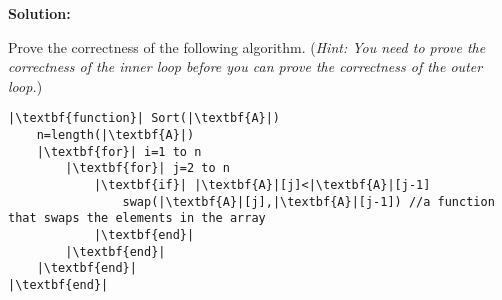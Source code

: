 \documentclass[9pt]{article}
\begin{document}
\textbf{Solution:} \\
        
        \fi
        \newpage
        
        
        
        \vspace{5mm}
        
        \item 
        Prove the correctness of the following algorithm. (\textit{Hint: You need to prove the correctness of the inner loop before you can prove the correctness of the outer loop.})
        
\begin{small}
\begin{lstlisting}
|\textbf{function}| Sort(|\textbf{A}|)
    n=length(|\textbf{A}|) 
    |\textbf{for}| i=1 to n
        |\textbf{for}| j=2 to n
            |\textbf{if}| |\textbf{A}|[j]<|\textbf{A}|[j-1]
                swap(|\textbf{A}|[j],|\textbf{A}|[j-1]) //a function that swaps the elements in the array
            |\textbf{end}|
        |\textbf{end}|
    |\textbf{end}|
|\textbf{end}|
\end{lstlisting}
\end{small}
        
\end{document}
